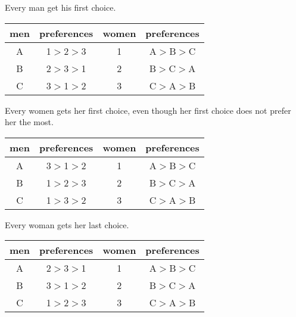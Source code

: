 \documentclass[11pt]{article}
\begin{document}
    \begin{Parts}
        
        \Part Every man get his first choice. 

        \begin{Answer}
            \begin{center}
                \begin{tabular}{|c|c||c|c|}\hline
                    men&preferences&women & preferences \\
                    \hline
                    A& 1$>$2$>$3 &1& A$>$B$>$C \\
                    \hline
                    B& 2$>$3$>$1 &2& B$>$C$>$A \\
                    \hline
                    C& 3$>$1$>$2 &3& C$>$A$>$B \\
                    \hline
                \end{tabular}
            \end{center}
        \end{Answer}

        \Part Every women gets her first choice, even though her first choice does not prefer her the most.
        
        \begin{Answer}
            \begin{center}
                \begin{tabular}{|c|c||c|c|}\hline
                    men&preferences&women & preferences \\
                    \hline
                    A& 3$>$1$>$2 &1& A$>$B$>$C \\
                    \hline
                    B& 1$>$2$>$3 &2& B$>$C$>$A \\
                    \hline
                    C& 1$>$3$>$2 &3& C$>$A$>$B \\
                    \hline
                \end{tabular}
            \end{center}
        \end{Answer}

        \Part Every woman gets her last choice. 

        \begin{Answer}
            \begin{center}
                \begin{tabular}{|c|c||c|c|}\hline
                    men&preferences&women & preferences \\
                    \hline
                    A& 2$>$3$>$1 &1& A$>$B$>$C \\
                    \hline
                    B& 3$>$1$>$2 &2& B$>$C$>$A \\
                    \hline
                    C& 1$>$2$>$3 &3& C$>$A$>$B \\
                    \hline
                \end{tabular}
            \end{center}
        \end{Answer}


\end{Parts}
\end{document}
